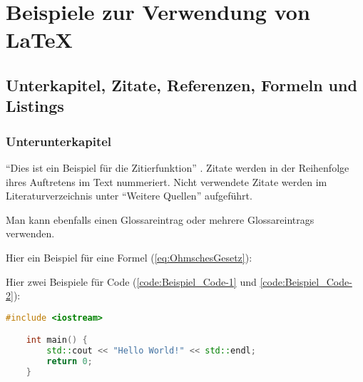 


\chapter{Beispiele zur Verwendung von LaTeX}
   
\section{Unterkapitel, Zitate, Referenzen, Formeln und Listings}
\label{sec:Unterkapitel}

\subsection{Unterunterkapitel}

\enquote{Dies ist ein Beispiel für die Zitierfunktion} \cite[Vgl.][S. 1 ff.]{2024}. Zitate werden in der Reihenfolge ihres Auftretens im Text nummeriert. Nicht verwendete Zitate werden im Literaturverzeichnis unter \enquote{Weitere Quellen} aufgeführt. 

Man kann ebenfalls einen \gls{Glossareintrag} oder mehrere \glspl{Glossareintrag} verwenden.

Hier ein Beispiel für eine Formel (\autoref{eq:OhmschesGesetz}):

Hier zwei Beispiele für Code (\autoref{code:Beispiel_Code-1} und \autoref{code:Beispiel_Code-2}):

\begin{lstlisting}[language=C++, caption={Beispiel: direktes einfügen von Code}, label={code:Beispiel_Code-1}]
    #include <iostream>

    int main() {
        std::cout << "Hello World!" << std::endl;
        return 0;
    }
\end{lstlisting}



